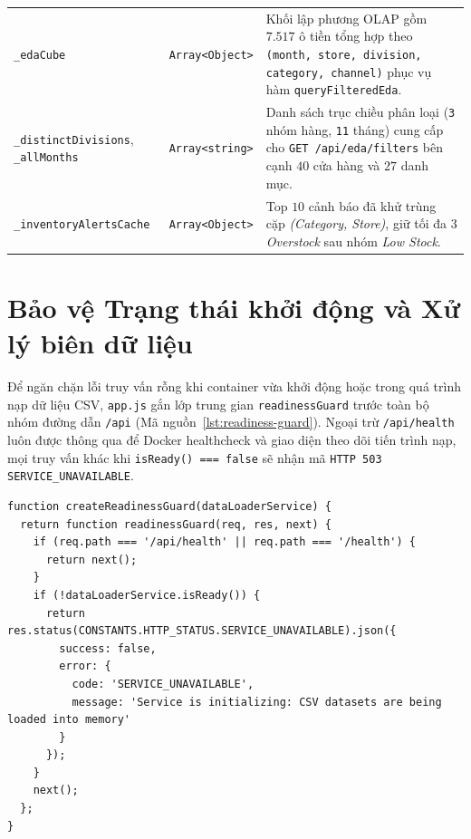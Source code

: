 \begin{table}[H]
\begin{tabular}{p{4.5cm} p{3.5cm} p{7.7cm}}
		\texttt{_edaCube}                                          & \texttt{Array<Object>}       & Khối lập phương OLAP gồm $7.517$ ô tiền tổng hợp theo \texttt{(month, store, division, category, channel)} phục vụ hàm \texttt{queryFilteredEda}.                        \\
		\texttt{_distinctDivisions}, \texttt{_allMonths} & \texttt{Array<string>}       & Danh sách trục chiều phân loại (\texttt{3} nhóm hàng, \texttt{11} tháng) cung cấp cho \texttt{GET /api/eda/filters} bên cạnh $40$ cửa hàng và $27$ danh mục.   \\
		\texttt{_inventoryAlertsCache}                             & \texttt{Array<Object>}       & Top $10$ cảnh báo đã khử trùng cặp \textit{(Category, Store)}, giữ tối đa $3$ \textit{Overstock} sau nhóm \textit{Low Stock}.                                                                \\
		\bottomrule
	\end{tabular}
\end{table}

\section{Bảo vệ Trạng thái khởi động và Xử lý biên dữ liệu}
\label{sec:ch3-guard}
Để ngăn chặn lỗi truy vấn rỗng khi container vừa khởi động hoặc trong quá trình nạp dữ liệu CSV, \texttt{app.js} gắn lớp trung gian \texttt{readinessGuard} trước toàn bộ nhóm đường dẫn \texttt{/api} (Mã nguồn~\ref{lst:readiness-guard}). Ngoại trừ \texttt{/api/health} luôn được thông qua để Docker healthcheck và giao diện theo dõi tiến trình nạp, mọi truy vấn khác khi \texttt{isReady() === false} sẽ nhận mã \texttt{HTTP 503 SERVICE_UNAVAILABLE}.

\begin{listing}[H]
	\begin{verbatim}
function createReadinessGuard(dataLoaderService) {
  return function readinessGuard(req, res, next) {
    if (req.path === '/api/health' || req.path === '/health') {
      return next();
    }
    if (!dataLoaderService.isReady()) {
      return res.status(CONSTANTS.HTTP_STATUS.SERVICE_UNAVAILABLE).json({
        success: false,
        error: {
          code: 'SERVICE_UNAVAILABLE',
          message: 'Service is initializing: CSV datasets are being loaded into memory'
        }
      });
    }
    next();
  };
}
\end{verbatim}
	\caption{Lớp bảo vệ trạng thái sẵn sàng trong \texttt{backend/middleware/readinessGuard.js}}
	\label{lst:readiness-guard}
\end{listing}

